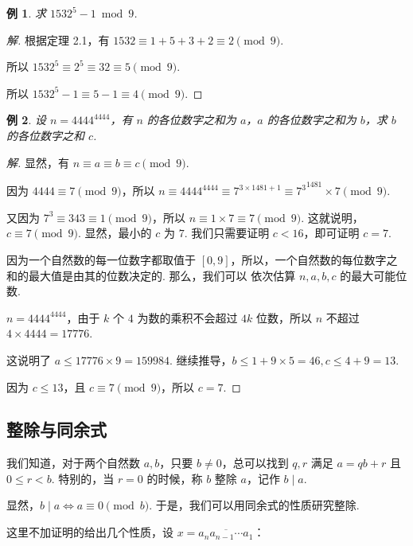 \documentclass[a4paper]{article}
\newtheorem{exam}{例}[subsection]
\begin{document}
\begin{exam}
    求 $1532^5-1\bmod 9$.
\end{exam}

\begin{proof}[解]
    根据定理 2.1，有 $1532\equiv 1+5+3+2\equiv 2 \pmod 9$.

    所以 $1532^5\equiv 2^5\equiv 32 \equiv 5 \pmod 9$.

    所以 $1532^5-1\equiv 5-1 \equiv 4 \pmod 9$.
\end{proof}

\begin{exam}
    设 $n=4444^{4444}$，有 $n$ 的各位数字之和为 $a$，$a$ 的各位数字之和为 $b$，求 $b$ 的各位数字之和 $c$.
\end{exam}

\begin{proof}[解]
    显然，有 $n\equiv a\equiv b \equiv c\pmod 9$.

    因为 $4444\equiv 7\pmod 9$，所以 $n\equiv 4444^{4444}\equiv 7^{3\times 1481+1}\equiv {7^3}^{1481}\times
        7\pmod 9$.

    又因为 $7^3\equiv 343\equiv 1\pmod 9$，所以 $n\equiv 1\times 7\equiv 7 \pmod 9$. 这就说明，$c\equiv 7
        \pmod 9$. 显然，最小的 $c$ 为 $7$. 我们只需要证明 $c<16$，即可证明 $c=7$.

    因为一个自然数的每一位数字都取值于 $[0,9]$，所以，一个自然数的每位数字之和的最大值是由其的位数决定的. 那么，我们可以
    依次估算 $n,a,b,c$ 的最大可能位数.

    $n=4444^{4444}$，由于 $k$ 个 $4$ 为数的乘积不会超过 $4k$ 位数，所以 $n$ 不超过 $4\times 4444=17776$.

    这说明了 $a\le 17776\times 9=159984$. 继续推导，$b\le 1+9\times 5=46,c\le 4+9=13$.

    因为 $c\le 13$，且 $c\equiv 7\pmod 9$，所以 $c=7$.
\end{proof}

\subsection{整除与同余式}

我们知道，对于两个自然数 $a,b$，只要 $b\ne 0$，总可以找到 $q,r$ 满足 $a=qb+r$ 且 $0\le r < b$. 特别的，当 $r=0$
的时候，称 $b$ 整除 $a$，记作 $b\mid a$.

显然，$b\mid a\Leftrightarrow a\equiv 0\pmod b$. 于是，我们可以用同余式的性质研究整除.

这里不加证明的给出几个性质，设 $x=\overline{a_na_{n-1}\cdots a_1}$：
\end{document}
